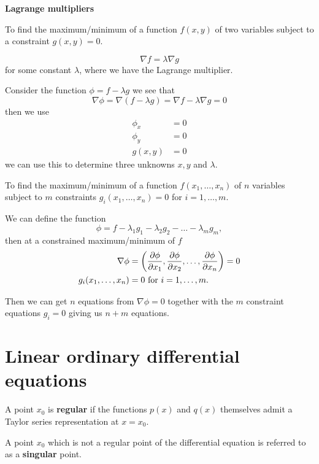 \documentclass[10pt, a4paper]{article}
\begin{document}
\textbf{Lagrange multipliers}

To find the maximum/minimum of a function $f(x, y)$ of two variables subject to a constraint $g(x, y) = 0$.

\[
\nabla f = \lambda\nabla g
\]
for some constant $\lambda$,
where we have the Lagrange multiplier.

Consider the function $\phi = f - \lambda g$ we see that
\[
\nabla \phi = \nabla(f - \lambda g) = \nabla f - \lambda\nabla g = 0
\]
then we use
\begin{align*}
    \phi_x &= 0 \\
    \phi_y &= 0 \\
    g(x, y) &= 0
\end{align*}
we can use this to determine three unknowns $x, y$ and $\lambda$.

To find the maximum/minimum of a function $f(x_1, \dotsc, x_n)$ of $n$ variables subject to $m$ constraints $g_i(x_1, \dotsc, x_n) = 0$ for $i = 1, \dotsc, m$.

We can define the function
\[
\phi = f - \lambda_1g_1 - \lambda_2g_2 - \dotsc - \lambda_mg_m,
\]
then at a constrained maximum/minimum of $f$
\begin{align*}
    \nabla \phi &= \left(\pd[\phi]{x_1}, \pd[\phi]{x_2}, \dotsc, \pd[\phi]{x_n}\right) = 0 \\
    g_i(x_1, \dotsc, x_n) &= 0\text{ for }i = 1, \dotsc, m.
\end{align*}

Then we can get $n$ equations from $\nabla \phi = 0$ together with the $m$ constraint equations $g_i = 0$ giving us $n + m$ equations.

\newpage

\section{Linear ordinary differential equations}

A point $x_0$ is \textbf{regular} if the functions $p(x)$ and $q(x)$ themselves admit a Taylor series representation at $x = x_0$.


A point $x_0$ which is not a regular point of the differential equation is referred to as a \textbf{singular} point.
\end{document}
